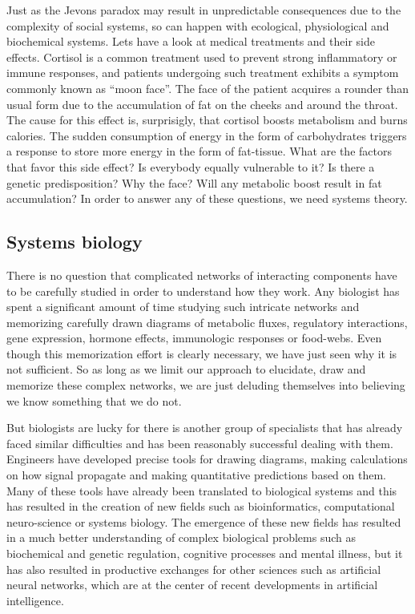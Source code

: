 \documentclass[12pt]{article}
\begin{document}
Just as the Jevons paradox may result in unpredictable consequences due to the complexity of social systems, so can happen with ecological, physiological and biochemical systems. Lets have a look at medical treatments and their side effects. Cortisol is a common treatment used to prevent strong inflammatory or immune responses, and patients undergoing such treatment exhibits a symptom commonly known as ``moon face''. The face of the patient acquires a rounder than usual form due to the accumulation of fat on the cheeks and around the throat. The cause for this effect is, surprisigly, that cortisol boosts metabolism and burns calories. The sudden consumption of energy in the form of carbohydrates triggers a response to store more energy in the form of fat-tissue. What are the factors that favor this side effect? Is everybody equally vulnerable to it? Is there a genetic predisposition? Why the face? Will any metabolic boost result in fat accumulation? In order to answer any of these questions, we need systems theory.


\subsection{Systems biology}

There is no question that complicated networks of interacting components have to be carefully studied in order to understand how they work. Any biologist has spent a significant amount of time studying such intricate networks and memorizing carefully drawn diagrams of metabolic fluxes, regulatory interactions, gene expression, hormone effects, immunologic responses or food-webs. Even though this memorization effort is clearly necessary, we have just seen why it is not sufficient. So as long as we limit our approach to elucidate, draw and memorize these complex networks, we are just deluding themselves into  believing we know something that we do not.

But biologists are lucky for there is another group of specialists that has already faced similar difficulties and has been reasonably successful dealing with them. Engineers have developed precise tools for drawing diagrams, making calculations on how signal propagate and making quantitative predictions based on them. Many of these tools have already been translated to biological systems and this has resulted in the creation of new fields such as bioinformatics, computational neuro-science or systems biology. The emergence of these new fields has resulted in a much better understanding of complex biological problems such as biochemical and genetic regulation, cognitive processes and mental illness, but it has also resulted in productive exchanges for other sciences such as artificial neural networks, which are at the center of recent developments in artificial intelligence.
\end{document}
